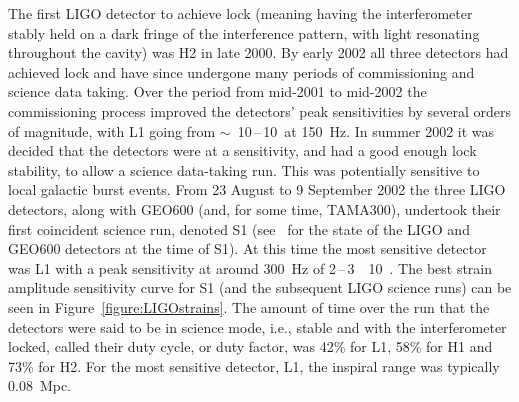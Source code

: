 The first LIGO detector to achieve lock (meaning having the interferometer
stably held on a dark fringe of the interference pattern, with light resonating
throughout the cavity) was H2 in late 2000. By early 2002 all three detectors
had achieved lock and have since undergone many periods of commissioning and
science data taking. Over the period from mid-2001 to mid-2002 the
commissioning process improved the detectors' peak sensitivities by several
orders of magnitude, with L1 going from
$\sim$~10\,--\,10~\Hz at 150~Hz. In summer 2002
it was decided that the detectors were at a sensitivity, and had a
good enough lock stability, to allow a science data-taking run. This
was potentially sensitive to local galactic burst events. From 23
August to 9 September 2002 the three LIGO detectors, along with GEO600
(and, for some time, TAMA300), undertook their first coincident
science run, denoted S1 (see~\cite{Abbott:2004a} for the state of the
LIGO and GEO600 detectors at the time of S1). At this time the most
sensitive detector was L1 with a peak sensitivity at around 300~Hz of
2\,--\,3~\texttimes~10~\Hz. The best strain
amplitude sensitivity curve for S1 (and the subsequent LIGO science runs) can be seen in
Figure~\ref{figure:LIGOstrains}. The amount of time over the run that
the detectors were said to be in science mode, i.e., stable and with
the interferometer locked, called their duty cycle, or duty factor,
was 42\% for L1, 58\% for H1 and 73\% for H2. For the most sensitive
detector, L1, the inspiral range was typically 0.08~Mpc.
